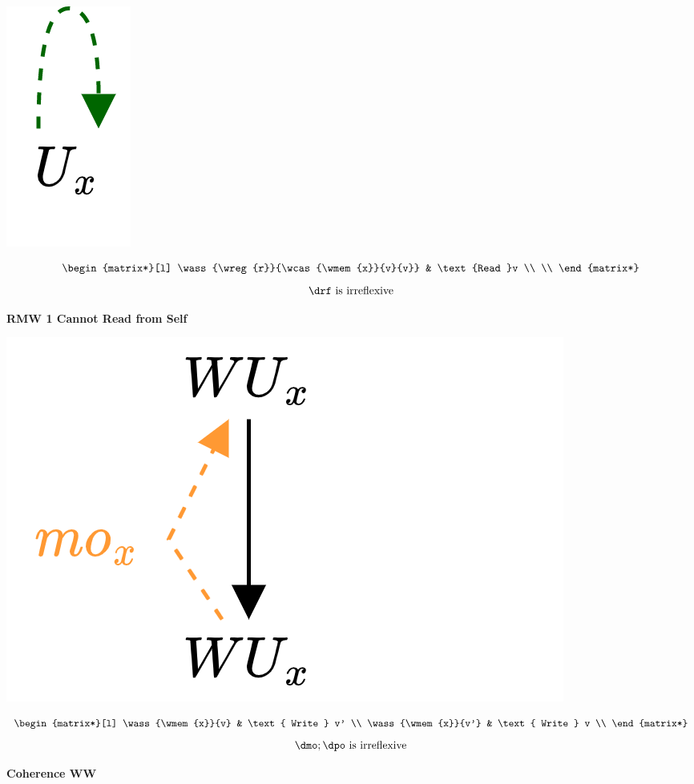 \begin{minipage}[b]{.33\textwidth}
    \begin{center}
        \includegraphics[scale=.15]{declarative_semantics/images/bad_patterns_rmw_1.drawio.png}
    \end{center}
    \[
        \begin{matrix*}[l]
            \wass{\wreg{r}}{\wcas{\wmem{x}}{v}{v}} & \text{Read }v \\
            \\
        \end{matrix*}    
    \]
    \[\drf \text{ is irreflexive}\]
    \centerline{\textbf{RMW 1 Cannot Read from Self}}
\end{minipage}
\begin{minipage}[b]{.33\textwidth}
    \begin{center}
        \includegraphics[scale=.15]{declarative_semantics/images/bad_patterns_coherence_ww.drawio.png}
    \end{center}
    \[\begin{matrix*}[l]
        \wass{\wmem{x}}{v} & \text{ Write } v' \\
        \wass{\wmem{x}}{v'} & \text{ Write } v \\
    \end{matrix*}\]
    \[\dmo ; \dpo \text{ is irreflexive}\]
    \centerline{\textbf{Coherence WW}}
\end{minipage}

